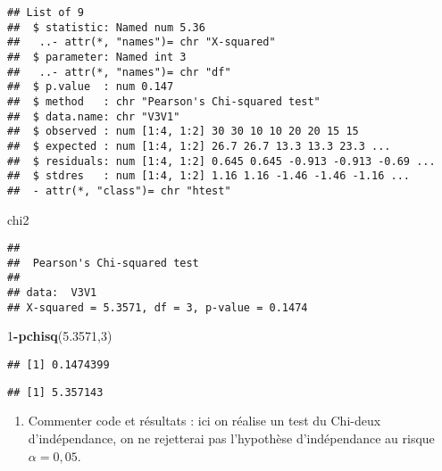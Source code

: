 \documentclass[
]{article}
\newenvironment{Shaded}{\begin{snugshade}}{\end{snugshade}}
\newcommand{\DecValTok}[1]{\textcolor[rgb]{0.00,0.00,0.81}{#1}}
\newcommand{\FloatTok}[1]{\textcolor[rgb]{0.00,0.00,0.81}{#1}}
\newcommand{\KeywordTok}[1]{\textcolor[rgb]{0.13,0.29,0.53}{\textbf{#1}}}
\newcommand{\NormalTok}[1]{#1}
\newcommand{\OperatorTok}[1]{\textcolor[rgb]{0.81,0.36,0.00}{\textbf{#1}}}
\providecommand{\tightlist}{%
  \setlength{\itemsep}{0pt}\setlength{\parskip}{0pt}}
\begin{document}
\begin{verbatim}
## List of 9
##  $ statistic: Named num 5.36
##   ..- attr(*, "names")= chr "X-squared"
##  $ parameter: Named int 3
##   ..- attr(*, "names")= chr "df"
##  $ p.value  : num 0.147
##  $ method   : chr "Pearson's Chi-squared test"
##  $ data.name: chr "V3V1"
##  $ observed : num [1:4, 1:2] 30 30 10 10 20 20 15 15
##  $ expected : num [1:4, 1:2] 26.7 26.7 13.3 13.3 23.3 ...
##  $ residuals: num [1:4, 1:2] 0.645 0.645 -0.913 -0.913 -0.69 ...
##  $ stdres   : num [1:4, 1:2] 1.16 1.16 -1.46 -1.46 -1.16 ...
##  - attr(*, "class")= chr "htest"
\end{verbatim}

\begin{Shaded}
\begin{Highlighting}[]
\NormalTok{chi2}
\end{Highlighting}
\end{Shaded}

\begin{verbatim}
## 
##  Pearson's Chi-squared test
## 
## data:  V3V1
## X-squared = 5.3571, df = 3, p-value = 0.1474
\end{verbatim}

\begin{Shaded}
\begin{Highlighting}[]
\DecValTok{1}\OperatorTok{-}\KeywordTok{pchisq}\NormalTok{(}\FloatTok{5.3571}\NormalTok{,}\DecValTok{3}\NormalTok{)}
\end{Highlighting}
\end{Shaded}

\begin{verbatim}
## [1] 0.1474399
\end{verbatim}

\begin{Shaded}
\end{Shaded}

\begin{verbatim}
## [1] 5.357143
\end{verbatim}

\begin{enumerate}
\def\labelenumi{\arabic{enumi}.}
\tightlist
\item
  Commenter code et résultats : ici on réalise un test du Chi-deux
  d'indépendance, on ne rejetterai pas l'hypothèse d'indépendance au
  risque \(\alpha = 0,05\).
\end{enumerate}
\end{document}
